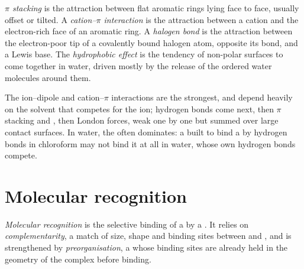 \begin{definition}\label{def:b3:supramolecular:interactions}
\emph{$\pi$ stacking} is the attraction between flat aromatic
rings lying face to face, usually offset or tilted. A \emph{cation--$\pi$
interaction} is the attraction between a cation and
the electron-rich face of an aromatic ring. A \emph{halogen bond}
is the attraction between the electron-poor tip of a covalently bound
halogen atom, opposite its bond, and a Lewis base. The \emph{hydrophobic
effect} is the tendency of non-polar surfaces to come
together in water, driven mostly by the release of the ordered water molecules
around them.
\end{definition}

The ion--dipole and cation--$\pi$ interactions are the strongest, and depend
heavily on the solvent that competes for the ion; hydrogen bonds come next,
then $\pi$ stacking and , then London forces, weak one by one but
summed over large contact surfaces. In water, the  often
dominates: a  built to bind a  by hydrogen bonds in chloroform may not
bind it at all in water, whose own hydrogen bonds compete.

\section{Molecular recognition}

\begin{definition}\label{def:b3:supramolecular:recognition}
\emph{Molecular recognition} is the selective
binding of a  by a . It relies on \emph{complementarity},
a match of size, shape and binding sites between  and , and is
strengthened by \emph{preorganisation}, a  whose
binding sites are already held in the geometry of the complex before binding.
\end{definition}

